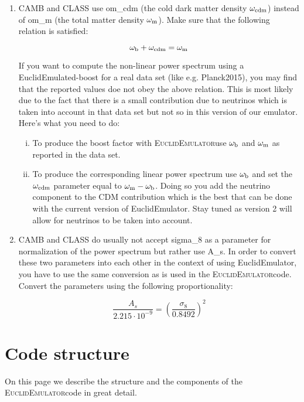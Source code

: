 \documentclass[american,11pt]{article}
\begin{document}
\begin{enumerate}
\item CAMB and CLASS use om\_cdm (the cold dark matter density $\omega_{\rm cdm}$) instead of om\_m (the total matter density $\omega_{\rm m}$). Make sure that the following relation is satisfied: 

\begin{equation}
\omega_{\rm b} + \omega_{\rm cdm} = \omega_{\rm m}
\end{equation}

If you want to compute the non-linear power spectrum using a EuclidEmulated-boost for a real data set (like e.g. Planck2015), you may find that the reported values doe not obey the above relation. This is most likely due to the fact that there is a small contribution due to neutrinos which is taken into account in that data set but not so in this version of our emulator. Here's what you need to do:

\begin{enumerate}[i.]
\item To produce the boost factor with \textsc{EuclidEmulator}use $\omega_{\rm b}$ and $\omega_{\rm m}$ as reported in the data set.
\item To produce the corresponding linear power spectrum use $\omega_{\rm b}$ and set the $ \omega_{\rm cdm}$ parameter equal to $\omega_{\rm m}-\omega_{\rm b}$. Doing so you add the neutrino component to the CDM contribution which is the best that can be done with the current version of EuclidEmulator. Stay tuned as version 2 will allow for neutrinos to be taken into account.
\end{enumerate}
\item CAMB and CLASS do usually not accept sigma\_8 as a parameter for normalization of the power spectrum but rather use A\_s. In order to convert these two parameters into each other in the context of using EuclidEmulator, you have to use the same conversion as is used in the \textsc{EuclidEmulator}code. Convert the parameters using the following proportionality:

\begin{equation}
\frac{A_s}{2.215\cdot 10^{-9}}=\left(\frac{\sigma_8}{0.8492}\right)^2
\end{equation}
\end{enumerate}
\newpage
\section{Code structure}
\label{CodeStructure}
On this page we describe the structure and the components of the \textsc{EuclidEmulator}code in great detail.
\end{document}
